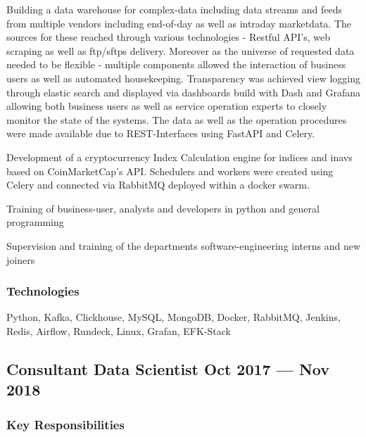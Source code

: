 \documentclass[letter,10pt]{article}
\begin{document}
\begin{zitemize}
	\item Building a data warehouse for complex-data including data streams and feeds from multiple vendors including end-of-day as well as intraday marketdata. The sources for these reached through various technologies - Restful API's, web scraping as well as ftp/sftps delivery. Moreover as the universe of requested data needed to be flexible - multiple components allowed the interaction of business users as well as automated housekeeping. Transparency was achieved view logging through elastic search and displayed via dashboards build with Dash and Grafana allowing both business users as well as service operation experts to closely monitor the state of the systems. The data as well as the operation procedures were made available due to  REST-Interfaces using FastAPI and Celery.

	\item Development of a cryptocurrency Index Calculation engine for indices and inavs based on CoinMarketCap's API. Schedulers and workers were created using Celery and connected via RabbitMQ deployed within a docker swarm. 

	\item Training of business-user, analysts and developers in python and general programming
	
	\item Supervision  and  training  of  the  departments  software-engineering interns and new joiners
	
\end{zitemize}

\subsubsection*{{Technologies}}

Python, Kafka, Clickhouse, MySQL, MongoDB, Docker, RabbitMQ, Jenkins, Redis, Airflow, Rundeck, Linux, Grafan, EFK-Stack \vspace{1em}


\subsection{{Consultant Data Scientist \hfill Oct 2017 --- Nov 2018}}


\subsubsection*{{Key Responsibilities}}
\end{document}
